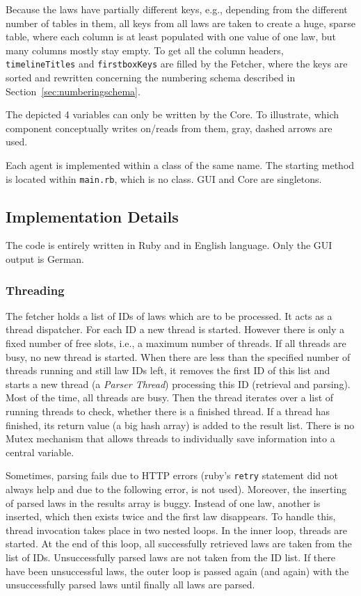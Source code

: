 \documentclass{scrartcl}
\begin{document}
Because the laws have partially different keys, e.g., depending from the different number of tables in them, all keys from all laws are taken to create a huge, sparse table, where each column is at least populated with one value of one law, but many columns mostly stay empty. To get all the column headers, \texttt{timelineTitles} and \texttt{firstboxKeys} are filled by the Fetcher, where the keys are sorted and rewritten concerning the numbering schema described in Section~\ref{sec:numberingschema}.

The depicted 4 variables can only be written by the Core. To illustrate, which component conceptually writes on/reads from them, gray, dashed arrows are used.

Each agent is implemented within a class of the same name. The starting method is located within \texttt{main.rb}, which is no class. GUI and Core are singletons.

\subsection{Implementation Details}
The code is entirely written in Ruby and in English language. Only the GUI output is German.

\subsubsection{Threading}
\label{sec:threading}
The fetcher holds a list of IDs of laws which are to be processed. It acts as a thread dispatcher. For each ID a new thread is started. However there is only a fixed number of free slots, i.e., a maximum number of threads. If all threads are busy, no new thread is started. When there are less than the specified number of threads running and still law IDs left, it removes the first ID of this list and starts a new thread (a \textit{Parser Thread}) processing this ID (retrieval and parsing). Most of the time, all threads are busy. Then the thread iterates over a list of running threads to check, whether there is a finished thread. If a thread has finished, its return value (a big hash array) is added to the result list. There is no Mutex mechanism that allows threads to individually save information into a central variable.

Sometimes, parsing fails due to HTTP errors (ruby's \texttt{retry} statement did not always help and due to the following error, is not used). Moreover, the inserting of parsed laws in the results array is buggy. Instead of one law, another is inserted, which then exists twice and the first law disappears. To handle this, thread invocation takes place in two nested loops. In the inner loop, threads are started. At the end of this loop, all successfully retrieved laws are taken from the list of IDs. Unsuccessfully parsed laws are not taken from the ID list. If there have been unsuccessful laws, the outer loop is passed again (and again) with the unsuccessfully parsed laws until finally all laws are parsed.
\end{document}
